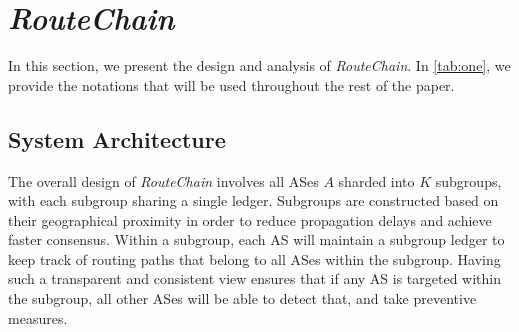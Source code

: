 \documentclass[5p]{elsarticle}
\newcommand{\rc}{{{\em RouteChain}}\xspace}
\begin{document}
\section{\rc}\label{sec:rc}
In this section, we present the design and analysis of \rc. In \autoref{tab:one}, we provide the notations that will be used throughout the rest of the paper.  


{\def\arraystretch{1}
\begin{table}\caption{Symbols and Definition}
\centering
{}
\label{tab:one}
\end{table} } 

\subsection{System Architecture}\label{sec:do}
The overall design of \rc involves all ASes $A$ sharded into $K$ subgroups, with each subgroup sharing a single ledger. Subgroups are constructed based on their geographical proximity in order to reduce propagation delays and achieve faster consensus. Within a subgroup, each AS will maintain a subgroup ledger to keep track of routing paths that belong to all ASes within the subgroup. Having such a transparent and consistent view ensures that if any AS is targeted within the subgroup, all other ASes will be able to detect that, and take preventive measures. 
\end{document}
